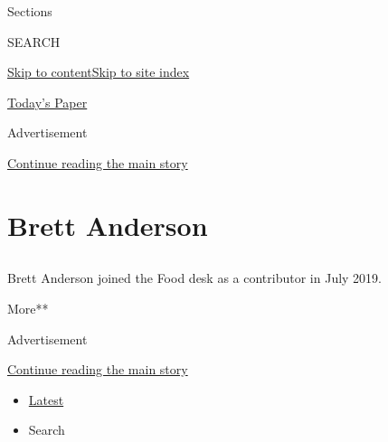 Sections

SEARCH

\protect\hyperlink{site-content}{Skip to
content}\protect\hyperlink{site-index}{Skip to site index}

\href{https://myaccount.nytimes3xbfgragh.onion/auth/login?response_type=cookie\&client_id=vi}{}

\href{https://www.nytimes3xbfgragh.onion/section/todayspaper}{Today's
Paper}

Advertisement

\protect\hyperlink{after-top}{Continue reading the main story}

\hypertarget{brett-anderson}{%
\section{Brett Anderson}\label{brett-anderson}}

\subsection{}

Brett Anderson joined the Food desk as a contributor in July 2019.~

More**

Advertisement

\protect\hyperlink{after-mid1}{Continue reading the main story}

\begin{itemize}
\tightlist
\item
  \protect\hyperlink{stream-panel}{Latest}
\item
  Search
\end{itemize}

